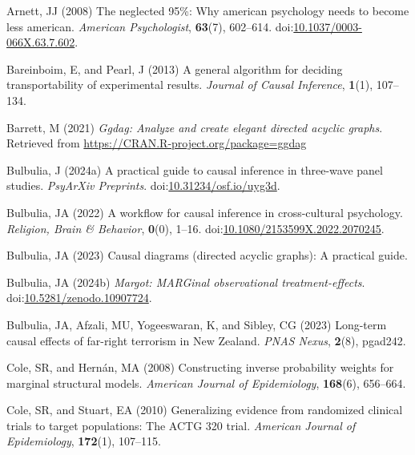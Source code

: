 \documentclass[
  single column]{article}
\newlength{\cslhangindent}
\newenvironment{CSLReferences}[2] %
 {\begin{list}{}{%
  \setlength{\itemindent}{0pt}
  \setlength{\leftmargin}{0pt}
  \setlength{\parsep}{0pt}
  \ifodd #1
   \setlength{\leftmargin}{\cslhangindent}
   \setlength{\itemindent}{-1\cslhangindent}
  \fi
  \setlength{\itemsep}{#2\baselineskip}}}
 {\end{list}}
\begin{document}
\label{refs}
\begin{CSLReferences}{1}{0}
Arnett, JJ (2008) The neglected 95\%: Why american psychology needs to
become less american. \emph{American Psychologist}, \textbf{63}(7),
602--614.
doi:\href{https://doi.org/10.1037/0003-066X.63.7.602}{10.1037/0003-066X.63.7.602}.

Bareinboim, E, and Pearl, J (2013) A general algorithm for deciding
transportability of experimental results. \emph{Journal of Causal
Inference}, \textbf{1}(1), 107--134.

Barrett, M (2021) \emph{Ggdag: Analyze and create elegant directed
acyclic graphs}. Retrieved from
\url{https://CRAN.R-project.org/package=ggdag}

Bulbulia, J (2024a) A practical guide to causal inference in three-wave
panel studies. \emph{PsyArXiv Preprints}.
doi:\href{https://doi.org/10.31234/osf.io/uyg3d}{10.31234/osf.io/uyg3d}.

Bulbulia, JA (2022) A workflow for causal inference in cross-cultural
psychology. \emph{Religion, Brain \& Behavior}, \textbf{0}(0), 1--16.
doi:\href{https://doi.org/10.1080/2153599X.2022.2070245}{10.1080/2153599X.2022.2070245}.

Bulbulia, JA (2023) Causal diagrams (directed acyclic graphs): A
practical guide.

Bulbulia, JA (2024b) \emph{Margot: MARGinal observational
treatment-effects}.
doi:\href{https://doi.org/10.5281/zenodo.10907724}{10.5281/zenodo.10907724}.

Bulbulia, JA, Afzali, MU, Yogeeswaran, K, and Sibley, CG (2023)
Long-term causal effects of far-right terrorism in {N}ew {Z}ealand.
\emph{PNAS Nexus}, \textbf{2}(8), pgad242.

Cole, SR, and Hernán, MA (2008) Constructing inverse probability weights
for marginal structural models. \emph{American Journal of Epidemiology},
\textbf{168}(6), 656--664.

Cole, SR, and Stuart, EA (2010) Generalizing evidence from randomized
clinical trials to target populations: The ACTG 320 trial.
\emph{American Journal of Epidemiology}, \textbf{172}(1), 107--115.


\end{CSLReferences}
\end{document}
